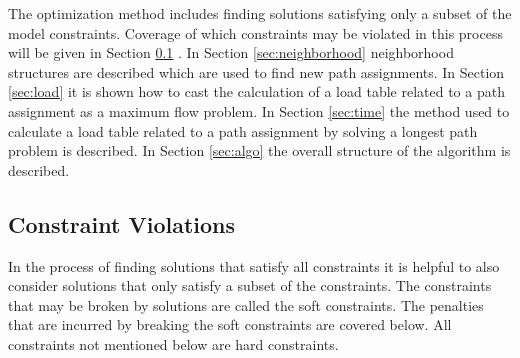 The optimization method includes finding solutions satisfying only a subset of the model constraints. Coverage of which constraints may be violated in this process will be given in Section \ref{sec:relaxation} .
In Section \ref{sec:neighborhood} neighborhood structures are described which are used to find new path assignments.
In Section \ref{sec:load} it is shown how to cast the calculation of a load table related to a path assignment as a maximum flow problem.
In Section \ref{sec:time} the method used to calculate a load table related to a path assignment by solving a longest path problem is described.
In Section \ref{sec:algo} the overall structure of the algorithm is described.













\subsection{Constraint Violations }
\label{sec:relaxation}

In the process of finding solutions that satisfy all constraints it is helpful to also consider solutions that only satisfy a subset of the constraints.
The constraints that may be broken by solutions are called the soft constraints.
The penalties that are incurred by breaking the soft constraints are covered below.
All constraints not mentioned below are hard constraints. \\


